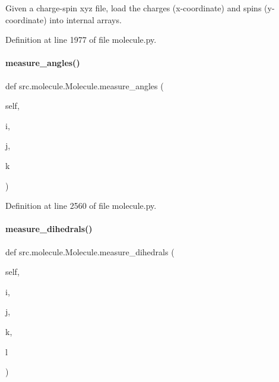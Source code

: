 Given a charge-\/spin xyz file, load the charges (x-\/coordinate) and spins (y-\/coordinate) into internal arrays. 



Definition at line 1977 of file molecule.\+py.

\mbox{\label{classsrc_1_1molecule_1_1Molecule_ad9a055066973a760e4898581224736b0}} 
\paragraph{\texorpdfstring{measure\+\_\+angles()}{measure\_angles()}}
{\footnotesize\ttfamily def src.\+molecule.\+Molecule.\+measure\+\_\+angles (\begin{DoxyParamCaption}\item[{}]{self,  }\item[{}]{i,  }\item[{}]{j,  }\item[{}]{k }\end{DoxyParamCaption})}



Definition at line 2560 of file molecule.\+py.

\mbox{\label{classsrc_1_1molecule_1_1Molecule_a4c1539dbe8854e261e7dbdb4a6fa0a98}} 
\paragraph{\texorpdfstring{measure\+\_\+dihedrals()}{measure\_dihedrals()}}
{\footnotesize\ttfamily def src.\+molecule.\+Molecule.\+measure\+\_\+dihedrals (\begin{DoxyParamCaption}\item[{}]{self,  }\item[{}]{i,  }\item[{}]{j,  }\item[{}]{k,  }\item[{}]{l }\end{DoxyParamCaption})}



